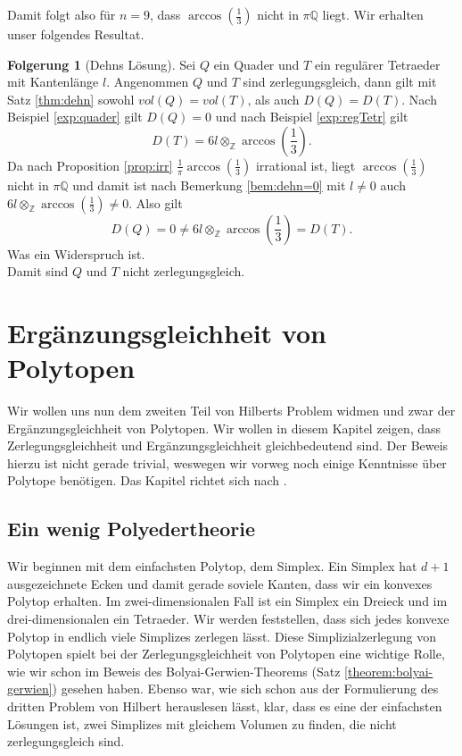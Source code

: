 \documentclass[11pt,titlepage]{article}
\newcommand{\setZ}{\mathbb{Z}}
\newcommand{\setQ}{\mathbb{Q}}
\theoremstyle{definition}
\newtheorem{corollary}[theorem]{Folgerung}
\theoremstyle{remark}
\begin{document}
	Damit folgt also für $n=9$, dass $\arccos\left(\frac{1}{3}\right)$ nicht in $\pi\setQ$ liegt. Wir erhalten unser 
	folgendes Resultat.
	
	\begin{corollary}[Dehns Lösung]
		Sei $Q$ ein Quader und $T$ ein regulärer Tetraeder mit Kantenlänge $l$. Angenommen 
		$Q$ und $T$ sind zerlegungsgleich, dann gilt mit Satz \ref{thm:dehn} sowohl $vol(Q)=vol(T)$, als auch 
		$D(Q)=D(T)$. 
		Nach Beispiel \ref{exp:quader} gilt $D(Q)=0$ und nach Beispiel \ref{exp:regTetr} gilt
		\[D(T)=6l\otimes_{\setZ}\arccos\left(\frac{1}{3}\right).\]
		Da nach Proposition \ref{prop:irr} $\frac{1}{\pi}\arccos\left(\frac{1}{3}\right)$ irrational ist, liegt
		$\arccos\left(\frac{1}{3}\right)$ nicht in $\pi\setQ$ und damit ist nach Bemerkung \ref{bem:dehn=0} 
		mit $l\neq 0$ auch $6l\otimes_{\setZ}\arccos\left(\frac{1}{3}\right)\neq 0$. Also gilt
		\[ D(Q)=0\neq 6l\otimes_{\setZ}\arccos\left(\frac{1}{3}\right)=D(T).\]
		Was ein Widerspruch ist. \\
		Damit sind $Q$ und $T$ nicht zerlegungsgleich.
	\end{corollary}	
	
	\newpage
	
	\section{Ergänzungsgleichheit von Polytopen}
	
	Wir wollen uns nun dem zweiten Teil von Hilberts Problem widmen und zwar der 
	Ergänzungsgleichheit von Polytopen. Wir wollen in diesem Kapitel zeigen, dass 
	Zerlegungsgleichheit und Ergänzungsgleichheit gleichbedeutend sind. Der 
	Beweis hierzu ist nicht gerade trivial, weswegen wir vorweg noch einige 
	Kenntnisse über Polytope benötigen. Das Kapitel richtet sich nach 
	\cite{Hadwiger}. 
	
	\subsection{Ein wenig Polyedertheorie}
	
	Wir beginnen mit dem einfachsten Polytop, dem Simplex. Ein Simplex hat 
	$d+1$ ausgezeichnete Ecken und damit gerade soviele Kanten, dass 
	wir ein konvexes Polytop erhalten. Im zwei-dimensionalen Fall ist ein 
	Simplex ein Dreieck und im drei-dimensionalen ein Tetraeder. Wir werden 
	feststellen, dass sich jedes konvexe Polytop in endlich viele Simplizes 
	zerlegen lässt. Diese Simplizialzerlegung von Polytopen spielt bei 
	der Zerlegungsgleichheit von Polytopen eine wichtige Rolle, wie wir schon im 
	Beweis des Bolyai-Gerwien-Theorems (Satz \ref{theorem:bolyai-gerwien}) 
	gesehen haben. Ebenso war, wie sich schon aus der Formulierung des dritten Problem von Hilbert herauslesen lässt, klar, dass es eine der einfachsten Lösungen ist, zwei Simplizes mit gleichem Volumen zu finden, die nicht zerlegungsgleich sind.
	
\end{document}

